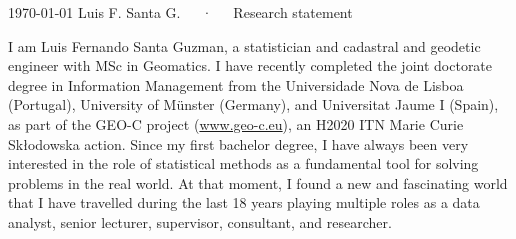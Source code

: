 \documentclass[11pt, a4paper]{awesome-cv}
\begin{document}
\makecvheader[R]

\makecvfooter
  {\today}
    {Luis F. Santa G.~~~·~~~Research statement}
  {}

\makelettertitle

\begin{cvletter}
I am Luis Fernando Santa Guzman, a statistician and cadastral and geodetic engineer with MSc in Geomatics.  I have recently completed the joint doctorate degree in Information Management from the Universidade Nova de Lisboa (Portugal), University of Münster (Germany), and Universitat Jaume I (Spain), as part of the GEO-C project (\url{www.geo-c.eu}), an H2020 ITN Marie Curie Skłodowska action. Since my first bachelor degree, I have always been very interested in the role of statistical methods as a fundamental tool for solving problems in the real world. At that moment, I found a new and fascinating world that I have travelled during the last 18 years playing multiple roles as a data analyst, senior lecturer, supervisor, consultant, and researcher.\par 

\end{cvletter}
\end{document}
